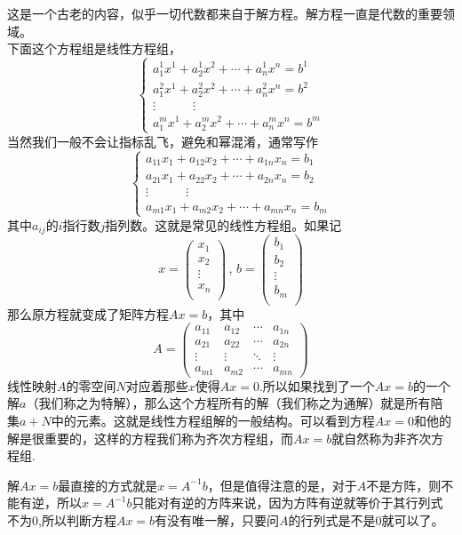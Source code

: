 \documentclass[11pt,a4paper,openany]{book}%
\theoremstyle{plain}%
\begin{document}
这是一个古老的内容，似乎一切代数都来自于解方程。解方程一直是代数的重要领域。\\
\indent 下面这个方程组是线性方程组，
\[
\begin{cases}
a_1^1 x^{1} + a_2^1 x^{2} + \cdots + a_n^1 x^{n}=  b^{1} \\
a_1^2 x^{1} + a_2^2x^{2} + \cdots + a_n^2 x^{n}=  b^{2} \\
\vdots \quad \quad \quad \vdots \\
a_1^m x^{1} + a_2^m x^{2} + \cdots + a_n^m x^{n}=  b^{m} 
\end{cases}
\]
当然我们一般不会让指标乱飞，避免和幂混淆，通常写作
\[
\begin{cases}
a_{11}x_{1} + a_{12}x_{2} + \cdots + a_{1n}x_{n}=  b_{1} \\
a_{21}x_{1} + a_{22}x_{2} + \cdots + a_{2n}x_{n}=  b_{2} \\
 \vdots \quad \quad \quad \vdots \\
a_{m1}x_{1} + a_{m2}x_{2} + \cdots + a_{mn}x_{n}=  b_{m} 
\end{cases}
\]
其中$a_{ij}$的$i$指行数$j$指列数。这就是常见的线性方程组。如果记
\[
x=\begin{pmatrix}
x_{1}\\
x_{2}\\
\vdots \\
x_{n}\\
\end{pmatrix}
\,,\,
b=\begin{pmatrix}
b_{1}\\
b_{2}\\
\vdots \\
b_{m}\\
\end{pmatrix}
\]
那么原方程就变成了矩阵方程$Ax=b$，其中
\[
A=
\begin{pmatrix}
a_{11} & a_{12} & \cdots & a_{1n} \\
a_{21} & a_{22} & \cdots & a_{2n} \\
\vdots & \vdots & \ddots & \vdots \\
a_{m1} & a_{m2} & \cdots & a_{mn}
\end{pmatrix}
\]
线性映射$A$的零空间$N$对应着那些$x$使得$Ax=0$.所以如果找到了一个$Ax=b$的一个解$a$（我们称之为{\kaishu 特解}），那么这个方程所有的解（我们称之为{\kaishu 通解}）就是所有陪集$a+N$中的元素。这就是线性方程组解的一般结构。可以看到方程$Ax=0$和他的解是很重要的，这样的方程我们称为{\kaishu 齐次方程组}，而$Ax=b$就自然称为{\kaishu 非齐次方程组}.

解$Ax=b$最直接的方式就是$x=A^{-1}b$，但是值得注意的是，对于$A$不是方阵，则不能有逆，所以$x=A^{-1}b$只能对有逆的方阵来说，因为方阵有逆就等价于其行列式不为0,所以判断方程$Ax=b$有没有唯一解，只要问$A$的行列式是不是0就可以了。\\
\end{document}
